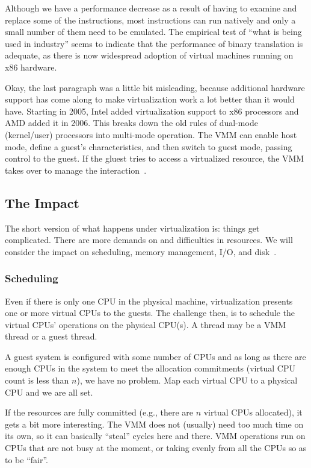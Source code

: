 Although we have a performance decrease as a result of having to examine and replace some of the instructions, most instructions can run natively and only a small number of them need to be emulated. The empirical test of ``what is being used in industry'' seems to indicate that the performance of binary translation is adequate, as there is now widespread adoption of virtual machines running on x86 hardware.

Okay, the last paragraph was a little bit misleading, because additional hardware support has come along to make virtualization work a lot better than it would have. Starting in 2005, Intel added virtualization support to x86 processors and AMD added it in 2006. This breaks down the old rules of dual-mode (kernel/user) processors into multi-mode operation. The VMM can enable host mode, define a guest's characteristics, and then switch to guest mode, passing control to the guest. If the gluest tries to access a virtualized resource, the VMM takes over to manage the interaction~\cite{osc}.


\subsection*{The Impact}

The short version of what happens under virtualization is: things get complicated. There are more demands on and difficulties in resources. We will consider the impact on scheduling, memory management, I/O, and disk~\cite{osc}.

\subsubsection*{Scheduling}

Even if there is only one CPU in the physical machine, virtualization presents one or more virtual CPUs to the guests. The challenge then, is to schedule the virtual CPUs' operations on the physical CPU(s). A thread may be a VMM thread or a guest thread.

A guest system is configured with some number of CPUs and as long as there are enough CPUs in the system to meet the allocation commitments (virtual CPU count is less than $n$), we have no problem. Map each virtual CPU to a physical CPU and we are all set. 

If the resources are fully committed (e.g., there are $n$ virtual CPUs allocated), it gets a bit more interesting. The VMM does not (usually) need too much time on its own, so it can basically ``steal'' cycles here and there. VMM operations run on CPUs that are not busy at the moment, or taking evenly from all the CPUs so as to be ``fair''. 

